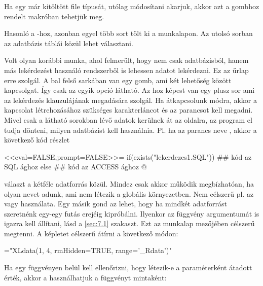 \begin{description}
\begin{description}
    Ha egy már kitöltött  file típusát, utólag
    módosítani akarjuk, akkor azt a gombhoz rendelt makróban tehetjük meg.
  \item[\code{Access form}] Hasonló a -hoz, azonban
    egyel több sort tölt ki a munkalapon.  Az utolsó 
    sorban az  adatbázis táblái közül lehet választani.  
  \item[\code{Access + SQL form}] Volt olyan korábbi munka, ahol
    felmerült, hogy nem csak 
     adatbázisból, hanem más  lekérdezést
    használó rendszerből is lehessen adatot lekérdezni. Ez az űrlap
    erre szolgál. A bal felső sarkában van egy gomb, ami két lehetőség között
    kapcsolgat. Így csak az egyik opció látható. Az hoz 
    képest van egy plusz sor ami az  lekérdezés 
    klauzulájának megadására szolgál. Ha átkapcsolunk  módra, akkor
    a kapcsolat létrehozásához szükséges  karakterláncot és
    az  
    parancsot kell megadni. Mivel csak a látható sorokban lévő adatok
    kerülnek át az  oldalra, az  program el tudja
    dönteni, milyen 
    adatbázist kell használnia. Pl. ha az  parancs  neve
    , akkor a következő kód részlet 
    \begin{Rnw}
<<eval=FALSE,prompt=FALSE>>=
if(exists("lekerdezes1.SQL")){
    ## kód az SQL ághoz
}else{
    ## kód az ACCESS ághoz
}
@
    \end{Rnw}
    választ a kétféle adatforrás közül. Mindez
    csak akkor működik megbízhatóan, ha  olyan nevet adunk, ami nem
    létezik a globális környezetben. Nem célszerű pl. az  vagy
     használata. Egy másik 
    gond az lehet, hogy ha mindkét adatforrást szeretnénk egy-egy
    futás erejéig kipróbálni. Ilyenkor az  függvény 
    argumentumát is igazra kell állítani, lásd a \ref{sec:7.1} szakaszt. Ezt az
     munkalap  mezőjében célszerű megtenni. A képletet
    célszerű átírni a következő módon:
\begin{VBAframe}
="XLdata(1, 4, rmHidden=TRUE, range='_Rdata')"
\end{VBAframe}
    Ha egy függvényen belül kell ellenőrizni, hogy létezik-e a
    paraméterként átadott  érték, akkor a 
    használhatjuk a  függvényt mintaként: 
    \begin{Rnw}

\end{Rnw}
\end{description}
\end{description}
